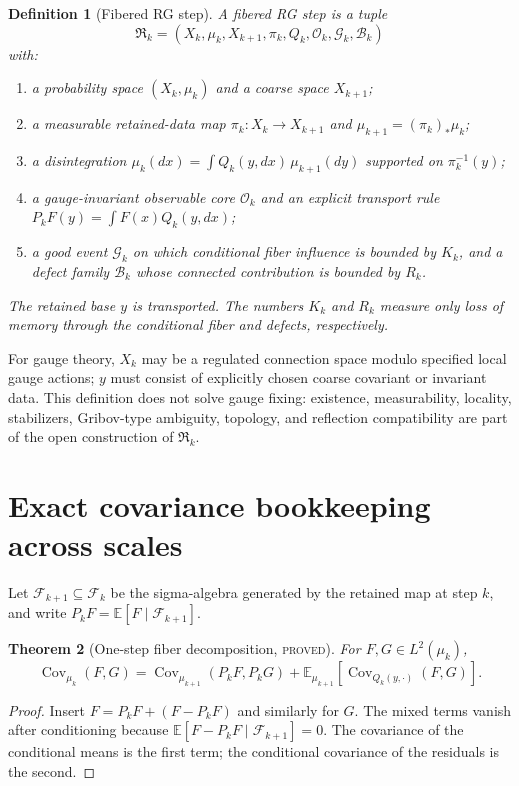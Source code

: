 \documentclass[11pt]{article}
\newcommand{\proved}{\textcolor{provedgreen}{\textsc{proved}}}
\newcommand{\Cov}{\operatorname{Cov}}
\newcommand{\E}{\mathbb E}
\newtheorem{definition}{Definition}[section]
\newtheorem{theorem}[definition]{Theorem}
\theoremstyle{remark}
\begin{document}
\begin{definition}[Fibered RG step]
A fibered RG step is a tuple
\[
 \mathfrak R_k=(X_k,\mu_k,X_{k+1},\pi_k,Q_k,\mathcal O_k,\mathcal G_k,\mathcal B_k)
\]
with:
\begin{enumerate}
\item a probability space $(X_k,\mu_k)$ and a coarse space $X_{k+1}$;
\item a measurable retained-data map $\pi_k:X_k\to X_{k+1}$ and
      $\mu_{k+1}=(\pi_k)_*\mu_k$;
\item a disintegration
      $\mu_k(dx)=\int Q_k(y,dx)\,\mu_{k+1}(dy)$ supported on
      $\pi_k^{-1}(y)$;
\item a gauge-invariant observable core $\mathcal O_k$ and an explicit
      transport rule $P_kF(y)=\int F(x)Q_k(y,dx)$;
\item a good event $\mathcal G_k$ on which conditional fiber influence is
      bounded by $K_k$, and a defect family $\mathcal B_k$ whose connected
      contribution is bounded by $R_k$.
\end{enumerate}
The retained base $y$ is transported.  The numbers $K_k$ and $R_k$ measure only
loss of memory through the conditional fiber and defects, respectively.
\end{definition}

For gauge theory, $X_k$ may be a regulated connection space modulo specified
local gauge actions; $y$ must consist of explicitly chosen coarse covariant or
invariant data.  This definition does not solve gauge fixing: existence,
measurability, locality, stabilizers, Gribov-type ambiguity, topology, and
reflection compatibility are part of the open construction of $\mathfrak R_k$.

\section{Exact covariance bookkeeping across scales}

Let $\mathcal F_{k+1}\subseteq\mathcal F_k$ be the sigma-algebra generated by
the retained map at step $k$, and write $P_kF=\E[F\mid\mathcal F_{k+1}]$.

\begin{theorem}[One-step fiber decomposition, \proved]\label{thm:one-step}
For $F,G\in L^2(\mu_k)$,
\begin{equation}\label{eq:total-cov}
 \Cov_{\mu_k}(F,G)
 =\Cov_{\mu_{k+1}}(P_kF,P_kG)
 +\E_{\mu_{k+1}}\!\left[
       \Cov_{Q_k(y,\cdot)}(F,G)
   \right].
\end{equation}
\end{theorem}
\begin{proof}
Insert $F=P_kF+(F-P_kF)$ and similarly for $G$.  The mixed terms vanish after
conditioning because $\E[F-P_kF\mid\mathcal F_{k+1}]=0$.  The covariance of
the conditional means is the first term; the conditional covariance of the
residuals is the second.
\end{proof}
\end{document}
